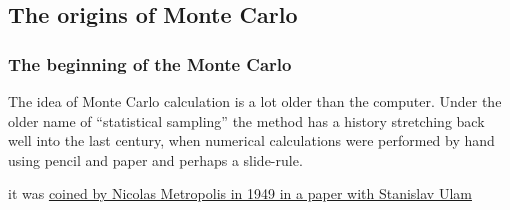 \documentclass[hyperref={colorlinks=true}]{beamer}
\begin{document}
\subsection[The origins of Monte Carlo]{The origins of Monte Carlo}

\begin{frame}%
  \frametitle{The beginning of the Monte Carlo}
  
  The idea of Monte Carlo calculation is a lot older than the computer. Under the older name of ``statistical sampling'' the method has a history stretching back well into the last century, when numerical calculations were performed by hand using pencil and paper and perhaps a slide-rule.
  
  \vspace{0.3cm}
  
   it was \href{https://www.tandfonline.com/doi/abs/10.1080/01621459.1949.10483310}{coined by Nicolas Metropolis in 1949 in a paper with Stanislav Ulam}
  
  \begin{figure}
    \centering
  \end{figure}
  
\end{frame}

\end{document}

